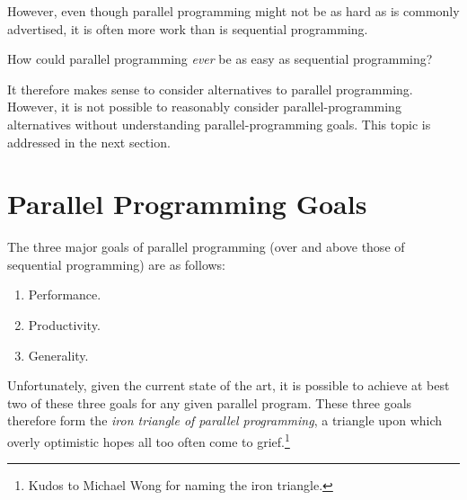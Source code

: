 However, even though parallel programming might not be as hard as
is commonly advertised, it is often more work than is sequential
programming.

\QuickQuiz{}
	How could parallel programming \emph{ever} be as easy
	as sequential programming?
 \QuickQuizEnd

It therefore makes sense to consider alternatives to parallel programming.
However, it is not possible to reasonably consider parallel-programming
alternatives without understanding parallel-programming goals.
This topic is addressed in the next section.

\section{Parallel Programming Goals}
\label{sec:intro:Parallel Programming Goals}

The three major goals of parallel programming (over and above those
of sequential programming) are as follows:

\begin{enumerate}
\item	Performance.
\item	Productivity.
\item	Generality.
\end{enumerate}

Unfortunately, given the current state of the art, it is possible to
achieve at best two of these three goals for any given parallel program.
These three goals therefore form the \emph{iron triangle of parallel
programming},
a triangle upon which overly optimistic hopes all too often come to
grief.\footnote{
	Kudos to Michael Wong for naming the iron triangle.}

